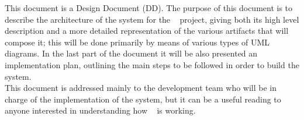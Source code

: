 This document is a Design Document (DD). The purpose of this document is to describe the architecture of the system for the \projectname~ project, giving both its high level description and a more detailed representation of the various artifacts that will compose it; this will be done primarily by means of various types of UML diagrams. In the last part of the document it will be also presented an implementation plan, outlining the main steps to be followed in order to build the system. \\
This document is addressed mainly to the development team who will be in charge of the implementation of the system, but it can be a useful reading to anyone interested in understanding how \projectname~ is working.